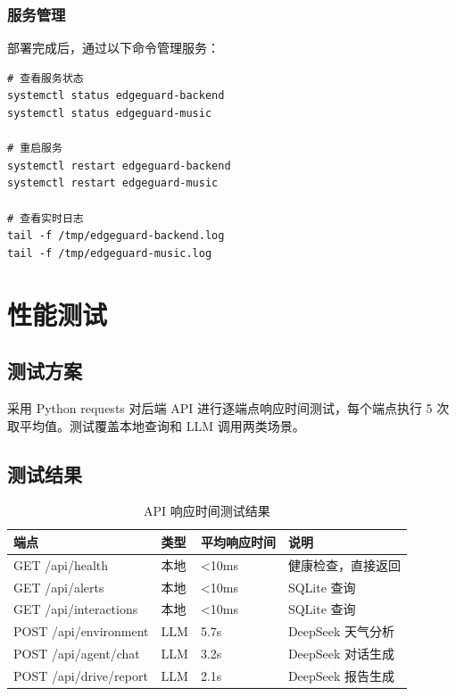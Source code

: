 \documentclass[a4paper]{article}
\begin{document}
\subsubsection{服务管理}

部署完成后，通过以下命令管理服务：

\begin{verbatim}
# 查看服务状态
systemctl status edgeguard-backend
systemctl status edgeguard-music

# 重启服务
systemctl restart edgeguard-backend
systemctl restart edgeguard-music

# 查看实时日志
tail -f /tmp/edgeguard-backend.log
tail -f /tmp/edgeguard-music.log
\end{verbatim}

\section{性能测试}

\subsection{测试方案}

采用 Python requests 对后端 API 进行逐端点响应时间测试，每个端点执行 5 次取平均值。测试覆盖本地查询和 LLM 调用两类场景。

\subsection{测试结果}

\begin{table}[H]
  \centering
  \caption{API 响应时间测试结果}
  \label{tab:perf_test}
  \begin{tabular}{llll}
  \toprule
  端点 & 类型 & 平均响应时间 & 说明 \\
  \midrule
  GET /api/health & 本地 & <10ms & 健康检查，直接返回 \\
  GET /api/alerts & 本地 & <10ms & SQLite 查询 \\
  GET /api/interactions & 本地 & <10ms & SQLite 查询 \\
  POST /api/environment & LLM & 5.7s & DeepSeek 天气分析 \\
  POST /api/agent/chat & LLM & 3.2s & DeepSeek 对话生成 \\
  POST /api/drive/report & LLM & 2.1s & DeepSeek 报告生成 \\
  \bottomrule
  \end{tabular}
\end{table}
\end{document}

